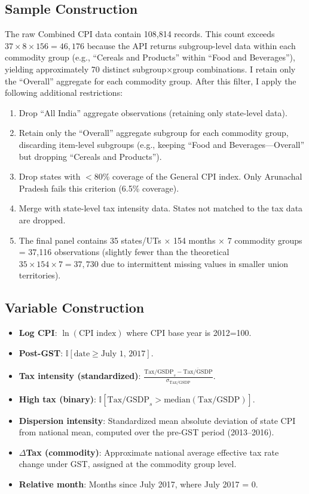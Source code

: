 \documentclass[12pt]{article}
\newcommand{\ind}{\mathbb{I}}
\begin{document}
\subsection{Sample Construction}

The raw Combined CPI data contain 108,814 records. This count exceeds $37 \times 8 \times 156 = 46{,}176$ because the API returns subgroup-level data within each commodity group (e.g., ``Cereals and Products'' within ``Food and Beverages''), yielding approximately 70 distinct subgroup$\times$group combinations. I retain only the ``Overall'' aggregate for each commodity group. After this filter, I apply the following additional restrictions:
\begin{enumerate}
  \item Drop ``All India'' aggregate observations (retaining only state-level data).
  \item Retain only the ``Overall'' aggregate subgroup for each commodity group, discarding item-level subgroups (e.g., keeping ``Food and Beverages---Overall'' but dropping ``Cereals and Products'').
  \item Drop states with $<$80\% coverage of the General CPI index. Only Arunachal Pradesh fails this criterion (6.5\% coverage).
  \item Merge with state-level tax intensity data. States not matched to the tax data are dropped.
  \item The final panel contains 35 states/UTs $\times$ 154 months $\times$ 7 commodity groups = 37,116 observations (slightly fewer than the theoretical $35 \times 154 \times 7 = 37{,}730$ due to intermittent missing values in smaller union territories).
\end{enumerate}

\subsection{Variable Construction}

\begin{itemize}
  \item \textbf{Log CPI}: $\ln(\text{CPI index})$ where CPI base year is 2012=100.
  \item \textbf{Post-GST}: $\ind[\text{date} \geq \text{July 1, 2017}]$.
  \item \textbf{Tax intensity (standardized)}: $\frac{\text{Tax/GSDP}_s - \overline{\text{Tax/GSDP}}}{\sigma_{\text{Tax/GSDP}}}$.
  \item \textbf{High tax (binary)}: $\ind[\text{Tax/GSDP}_s > \text{median}(\text{Tax/GSDP})]$.
  \item \textbf{Dispersion intensity}: Standardized mean absolute deviation of state CPI from national mean, computed over the pre-GST period (2013--2016).
  \item \textbf{$\Delta$Tax (commodity)}: Approximate national average effective tax rate change under GST, assigned at the commodity group level.
  \item \textbf{Relative month}: Months since July 2017, where July 2017 = 0.
\end{itemize}
\end{document}
